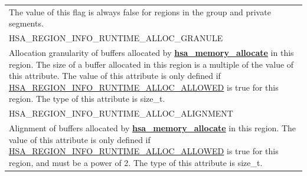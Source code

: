 \documentclass[final,oneside]{book}
\newcommand{\reffun}[1]{\textbf{#1}}
\newcommand{\reftyp}[1]{#1}
\newcommand{\refenu}[1]{\reftyp{#1}}
\begin{document}
\begin{longtable}{@{\hspace{2em}}p{\linewidth-2em}}
The value of this flag is always false for regions in the group and private segments.\\[2mm]
\hspace{-2em}\refenu{HSA_\-REGION_\-INFO_\-RUNTIME_\-ALLOC_\-GRANULE}\\Allocation granularity of buffers allocated by \hyperlink{group__memory_1ga39f7943b93aa2bb754726fc74d929426}{\reffun{hsa_\-memory_\-allocate}} in this region. The size of a buffer allocated in this region is a multiple of the value of this attribute. The value of this attribute is only defined if \hyperlink{group__memory_1ggad35755078ff15f645c6c25e7f7ef2707afeba9dee45ad3e79940b7a4159ef5f67}{HSA_\-REGION_\-INFO_\-RUNTIME_\-ALLOC_\-ALLOWED} is true for this region. The type of this attribute is size_t.\\[2mm]
\hspace{-2em}\refenu{HSA_\-REGION_\-INFO_\-RUNTIME_\-ALLOC_\-ALIGNMENT}\\Alignment of buffers allocated by \hyperlink{group__memory_1ga39f7943b93aa2bb754726fc74d929426}{\reffun{hsa_\-memory_\-allocate}} in this region. The value of this attribute is only defined if \hyperlink{group__memory_1ggad35755078ff15f645c6c25e7f7ef2707afeba9dee45ad3e79940b7a4159ef5f67}{HSA_\-REGION_\-INFO_\-RUNTIME_\-ALLOC_\-ALLOWED} is true for this region, and must be a power of 2. The type of this attribute is size_t.
\end{longtable}
\end{document}
